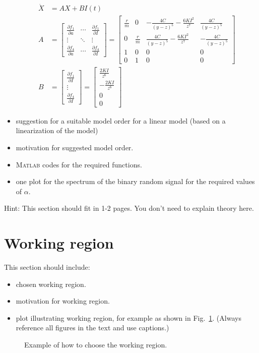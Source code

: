 \documentclass[10pt,a4paper]{article}
\begin{document}
\begin{itemize}
\begin{align*}
		\dot{X} &= A X + B I(t) \\
		A &= \begin{bmatrix} \frac{\partial f_{1}}{\partial a} & \cdots & \frac{\partial f_{1}}{\partial I} \\ \vdots & \ddots & \vdots \\ \frac{\partial f_{4}}{\partial a} & \cdots & \frac{\partial f_{4}}{\partial I} \end{bmatrix} = \begin{bmatrix} \frac{r}{m} & 0 & - \frac{4 C}{(y - z)^{5}} - \frac{6 K I^{2}}{z^{7}} & \frac{4 C}{(y - z)^{5}} \\ 0 & \frac{r}{m} & \frac{4 C}{(y - z)^{5}} - \frac{6 K I^{2}}{z^{7}} & - \frac{4 C}{(y - z)^{5}} \\ 1 & 0 & 0 & 0 \\ 0 & 1 & 0 & 0 \end{bmatrix} \\ 
		B &= \begin{bmatrix} \frac{\partial f_{1}}{\partial I} \\ \vdots \\ \frac{\partial f_{4}}{\partial I} \end{bmatrix} = \begin{bmatrix} \frac{2 K I}{z^{6}} \\ - \frac{2 K I}{z^{6}} \\ 0 \\ 0 \end{bmatrix}
	\end{align*}
    \item suggestion for a suitable model order for a linear model (based on a linearization of the model)
    \item motivation for suggested model order.
    \item \textsc{Matlab} codes for the required functions.
    \item one plot for the spectrum of the binary random signal for the required values of $\alpha$.
\end{itemize}
Hint: This section should fit in 1-2 pages. You don't need to explain theory here.

\section{Working region}
This section should include:
\begin{itemize}
    \item chosen working region.
    \item motivation for working region.
    \item plot illustrating working region, for example as shown in Fig.~\ref{fig:workingRegion}. (Always reference all figures in the text and use captions.)
\end{itemize}
%
\begin{figure}[t]
\footnotesize
\centering 
\def\svgwidth{.8\columnwidth}
 
\caption{Example of how to choose the working region.}
\label{fig:workingRegion}
\end{figure}
\end{document}
